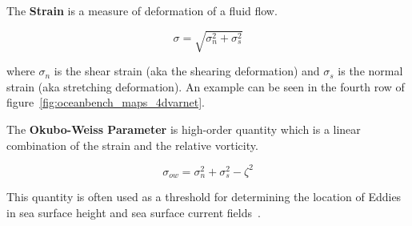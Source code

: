 The \textbf{Strain} is a measure of deformation of a fluid flow.

\begin{equation} \label{eq:strain}
    \sigma = \sqrt{\sigma_n^2 + \sigma_s^2}
\end{equation}

where $\sigma_n$ is the shear strain (aka the shearing deformation) and $\sigma_s$ is the normal strain (aka stretching deformation). An example can be seen in the fourth row of figure~\ref{fig:oceanbench_maps_4dvarnet}.

The \textbf{Okubo-Weiss Parameter} is high-order quantity which is a linear combination of the strain and the relative vorticity.

\begin{equation} \label{eq:okuboweiss}
    \sigma_{ow} = \sigma_n^2 + \sigma_s^2 - \zeta^2
\end{equation}

This quantity is often used as a threshold for determining the location of Eddies in sea surface height and sea surface current fields~\cite{OKUBO, WEISS, OKUBOWEISS}.



